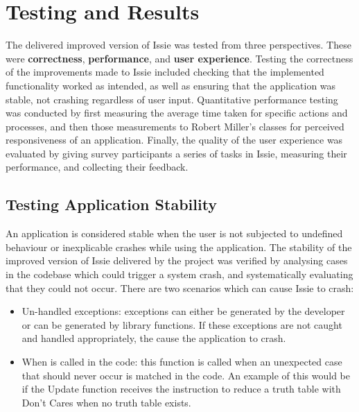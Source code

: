 \chapter{Testing and Results}
The delivered improved version of Issie was tested from three perspectives. These were \textbf{correctness}, \textbf{performance}, and \textbf{user experience}. Testing the correctness of the improvements made to Issie included checking that the implemented functionality worked as intended, as well as ensuring that the application was stable, not crashing regardless of user input. Quantitative performance testing was conducted by first measuring the average time taken for specific actions and processes, and then those measurements to Robert Miller's \cite{Miller1968ResponseTI} classes for perceived responsiveness of an application. Finally, the quality of the user experience was evaluated by giving survey participants a series of tasks in Issie, measuring their performance, and collecting their feedback.

\section{Testing Application Stability} \label{sec:testappstability}
An application is considered stable when the user is not subjected to undefined behaviour or inexplicable crashes while using the application. The stability of the improved version of Issie delivered by the project was verified by analysing cases in the codebase which could trigger a system crash, and systematically evaluating that they could not occur. There are two scenarios which can cause Issie to crash:
\begin{itemize}
    \item Un-handled exceptions: exceptions can either be generated by the developer or can be generated by library functions. If these exceptions are not caught and handled appropriately, the cause the application to crash.
    \item When  is called in the code: this function is called when an unexpected case that should never occur is matched in the code. An example of this would be if the Update function receives the instruction to reduce a truth table with Don't Cares when no truth table exists.
\end{itemize}

